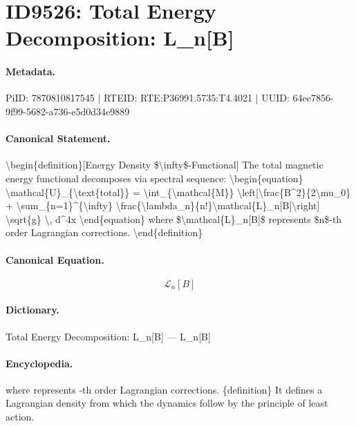 \section*{ID9526: Total Energy Decomposition: L\_n[B]}
\paragraph{Metadata.}
PiID: 7870810817545 | RTEID: RTE:P36991.5735:T4.4021 | UUID: 64ee7856-9f99-5682-a736-e5d0d34e9889

\paragraph{Canonical Statement.}
\textbackslash{}begin\{definition\}[Energy Density \$\textbackslash{}infty\$-Functional] The total magnetic energy functional decomposes via spectral sequence: \textbackslash{}begin\{equation\} \textbackslash{}mathcal\{U\}\_\{\textbackslash{}text\{total\}\} = \textbackslash{}int\_\{\textbackslash{}mathcal\{M\}\} \textbackslash{}left[\textbackslash{}frac\{B\textasciicircum{}2\}\{2\textbackslash{}mu\_0\} + \textbackslash{}sum\_\{n=1\}\textasciicircum{}\{\textbackslash{}infty\} \textbackslash{}frac\{\textbackslash{}lambda\_n\}\{n!\}\textbackslash{}mathcal\{L\}\_n[B]\textbackslash{}right] \textbackslash{}sqrt\{g\} \textbackslash{}, d\textasciicircum{}4x \textbackslash{}end\{equation\} where \$\textbackslash{}mathcal\{L\}\_n[B]\$ represents \$n\$-th order Lagrangian corrections. \textbackslash{}end\{definition\}

\paragraph{Canonical Equation.}
\[
\mathcal{L}_n[B]
\]

\paragraph{Dictionary.}
Total Energy Decomposition: L\_n[B] — L\_n[B]

\paragraph{Encyclopedia.}
where represents -th order Lagrangian corrections. \{definition\} It defines a Lagrangian density from which the dynamics follow by the principle of least action.
